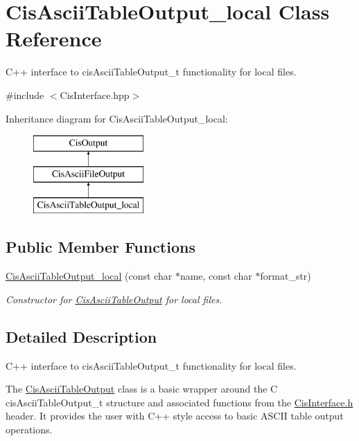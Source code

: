 \hypertarget{classCisAsciiTableOutput__local}{}\section{Cis\+Ascii\+Table\+Output\+\_\+local Class Reference}
\label{classCisAsciiTableOutput__local}


C++ interface to cis\+Ascii\+Table\+Output\+\_\+t functionality for local files.  




{\ttfamily \#include $<$Cis\+Interface.\+hpp$>$}

Inheritance diagram for Cis\+Ascii\+Table\+Output\+\_\+local\+:\begin{figure}[H]
\begin{center}
\leavevmode
\includegraphics[height=3.000000cm]{classCisAsciiTableOutput__local}
\end{center}
\end{figure}
\subsection*{Public Member Functions}
\begin{DoxyCompactItemize}
\item 
\mbox{\hyperlink{classCisAsciiTableOutput__local_af18720ffabf013387aa1bcb8f8826ce3}{Cis\+Ascii\+Table\+Output\+\_\+local}} (const char $\ast$name, const char $\ast$format\+\_\+str)
\begin{DoxyCompactList}\small\item\em Constructor for \mbox{\hyperlink{classCisAsciiTableOutput}{Cis\+Ascii\+Table\+Output}} for local files. \end{DoxyCompactList}\end{DoxyCompactItemize}


\subsection{Detailed Description}
C++ interface to cis\+Ascii\+Table\+Output\+\_\+t functionality for local files. 

The \mbox{\hyperlink{classCisAsciiTableOutput}{Cis\+Ascii\+Table\+Output}} class is a basic wrapper around the C cis\+Ascii\+Table\+Output\+\_\+t structure and associated functions from the \mbox{\hyperlink{CisInterface_8h_source}{Cis\+Interface.\+h}} header. It provides the user with C++ style access to basic A\+S\+C\+II table output operations. 

